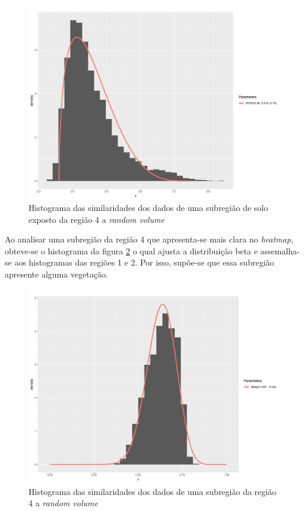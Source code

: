 \documentclass[12pt]{article}
\begin{document}
\begin{figure}[!h]

  \centering
  \includegraphics[width=0.75\linewidth]{../../Figures/Report_19_02_27/hist_rv_subregion4.pdf}
  \caption{Histograma das similaridades dos dados de uma subregião de solo exposto da região 4 a \textit{random volume}}
  \label{fig:hist_sub_rv4.1}

\end{figure}

Ao analisar uma subregião da região 4 que apresenta-se mais clara no \textit{heatmap}, obteve-se o histograma da figura \ref{fig:hist_sub_rv4.2} o qual ajusta a distribuição beta e assemalha-se aos histogramas das regiões 1 e 2. Por isso, supõe-se que essa subregião apresente alguma vegetação.

\begin{figure}[!h]

  \centering
  \includegraphics[width=0.75\linewidth]{../../Figures/Report_19_02_27/hist_rv_subregion4_2.pdf}
  \caption{Histograma das similaridades dos dados de uma subregião da região 4 a \textit{random volume}}
  \label{fig:hist_sub_rv4.2}

\end{figure}
\end{document}
